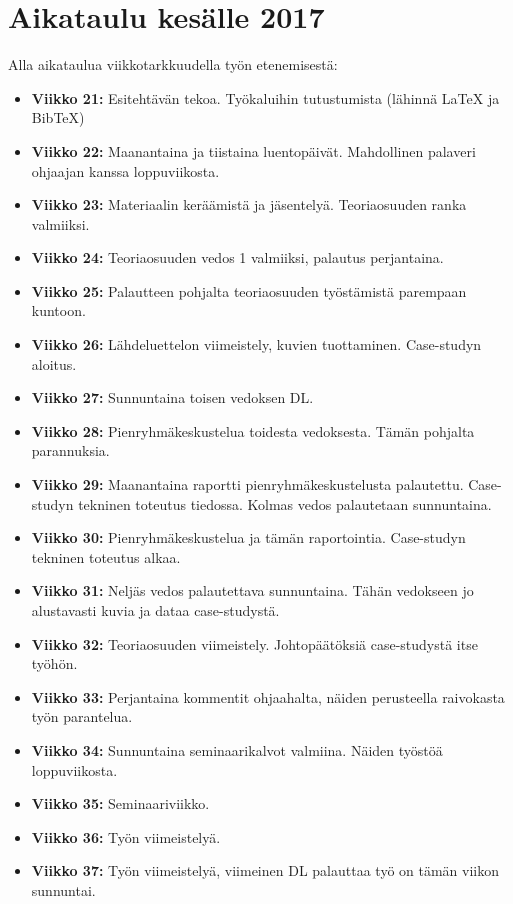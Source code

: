 \documentclass[finnish,12pt,a4paper,pdftex,elec,utf8]{aaltothesis}
\begin{document}
\section{Aikataulu kesälle 2017}
Alla aikataulua viikkotarkkuudella työn etenemisestä:
\begin{itemize}
    \item \textbf{Viikko 21:} Esitehtävän tekoa. Työkaluihin tutustumista (lähinnä LaTeX ja BibTeX)
    \item \textbf{Viikko 22:} Maanantaina ja tiistaina luentopäivät. Mahdollinen palaveri ohjaajan kanssa loppuviikosta.
    \item \textbf{Viikko 23:} Materiaalin keräämistä ja jäsentelyä. Teoriaosuuden ranka valmiiksi.
    \item \textbf{Viikko 24:} Teoriaosuuden vedos 1 valmiiksi, palautus perjantaina.
    \item \textbf{Viikko 25:} Palautteen pohjalta teoriaosuuden työstämistä parempaan kuntoon.
    \item \textbf{Viikko 26:} Lähdeluettelon viimeistely, kuvien tuottaminen. Case-studyn aloitus.
    \item \textbf{Viikko 27:} Sunnuntaina toisen vedoksen DL.
    \item \textbf{Viikko 28:} Pienryhmäkeskustelua toidesta vedoksesta. Tämän pohjalta parannuksia.
    \item \textbf{Viikko 29:} Maanantaina raportti pienryhmäkeskustelusta palautettu. Case-studyn tekninen toteutus tiedossa. Kolmas vedos palautetaan sunnuntaina.
    \item \textbf{Viikko 30:} Pienryhmäkeskustelua ja tämän raportointia. Case-studyn tekninen toteutus alkaa.
    \item \textbf{Viikko 31:} Neljäs vedos palautettava sunnuntaina. Tähän vedokseen jo alustavasti kuvia ja dataa case-studystä.
    \item \textbf{Viikko 32:} Teoriaosuuden viimeistely. Johtopäätöksiä case-studystä itse työhön.
    \item \textbf{Viikko 33:} Perjantaina kommentit ohjaahalta, näiden perusteella raivokasta työn parantelua.
    \item \textbf{Viikko 34:} Sunnuntaina seminaarikalvot valmiina. Näiden työstöä loppuviikosta.
    \item \textbf{Viikko 35:} Seminaariviikko.
    \item \textbf{Viikko 36:} Työn viimeistelyä.
    \item \textbf{Viikko 37:} Työn viimeistelyä, viimeinen DL palauttaa työ on tämän viikon sunnuntai.

















\end{itemize}
\clearpage

\nocite{*}


\end{document}
